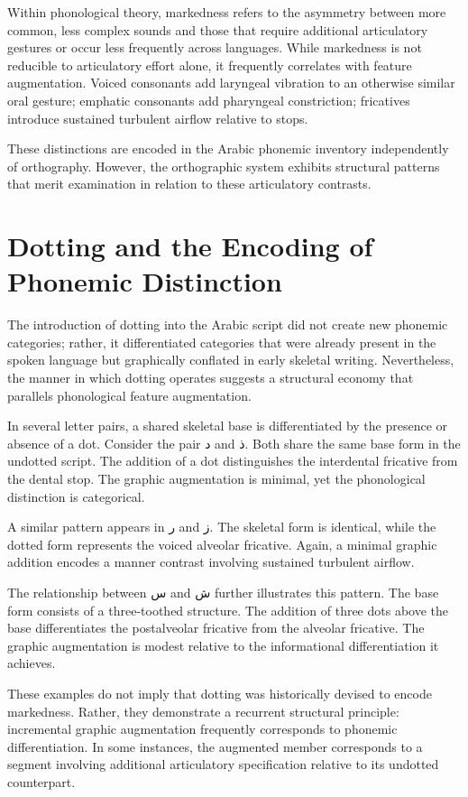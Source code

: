 \documentclass[11pt]{article}
\begin{document}
Within phonological theory, markedness refers to the asymmetry between more common, less complex sounds and those that require additional articulatory gestures or occur less frequently across languages. While markedness is not reducible to articulatory effort alone, it frequently correlates with feature augmentation. Voiced consonants add laryngeal vibration to an otherwise similar oral gesture; emphatic consonants add pharyngeal constriction; fricatives introduce sustained turbulent airflow relative to stops.

These distinctions are encoded in the Arabic phonemic inventory independently of orthography. However, the orthographic system exhibits structural patterns that merit examination in relation to these articulatory contrasts.

\section{Dotting and the Encoding of Phonemic Distinction}

The introduction of dotting into the Arabic script did not create new phonemic categories; rather, it differentiated categories that were already present in the spoken language but graphically conflated in early skeletal writing. Nevertheless, the manner in which dotting operates suggests a structural economy that parallels phonological feature augmentation.

In several letter pairs, a shared skeletal base is differentiated by the presence or absence of a dot. Consider the pair \textarabic{د} and \textarabic{ذ}. Both share the same base form in the undotted script. The addition of a dot distinguishes the interdental fricative from the dental stop. The graphic augmentation is minimal, yet the phonological distinction is categorical.

A similar pattern appears in \textarabic{ر} and \textarabic{ز}. The skeletal form is identical, while the dotted form represents the voiced alveolar fricative. Again, a minimal graphic addition encodes a manner contrast involving sustained turbulent airflow.

The relationship between \textarabic{س} and \textarabic{ش} further illustrates this pattern. The base form consists of a three-toothed structure. The addition of three dots above the base differentiates the postalveolar fricative from the alveolar fricative. The graphic augmentation is modest relative to the informational differentiation it achieves.

These examples do not imply that dotting was historically devised to encode markedness. Rather, they demonstrate a recurrent structural principle: incremental graphic augmentation frequently corresponds to phonemic differentiation. In some instances, the augmented member corresponds to a segment involving additional articulatory specification relative to its undotted counterpart.
\end{document}
